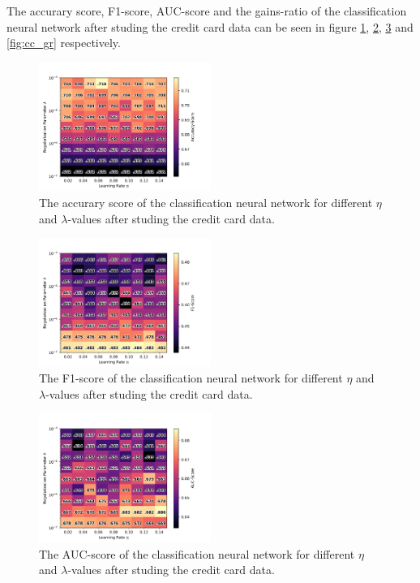 		The accurary score, F1-score, AUC-score and the gains-ratio of the classification neural network after studing the credit card data can be seen in figure \ref{fig:cc_acc}, \ref{fig:cc_F1}, \ref{fig:cc_auc} and \ref{fig:cc_gr} respectively.

		\begin{figure}[H]
			\centering
			\includegraphics[width=0.5\textwidth]{figures/cc_res_0.pdf}
			\caption{The accurary score of the classification neural network for different $\eta$ and $\lambda$-values after studing the credit card data.}
			\label{fig:cc_acc}
		\end{figure}
		\begin{figure}[H]
			\centering
			\includegraphics[width=0.5\textwidth]{figures/cc_res_1.pdf}
			\caption{The F1-score of the classification neural network for different $\eta$ and $\lambda$-values after studing the credit card data.}
			\label{fig:cc_F1}
		\end{figure}
		\begin{figure}[H]
			\centering
			\includegraphics[width=0.5\textwidth]{figures/cc_res_2.pdf}
			\caption{The AUC-score of the classification neural network for different $\eta$ and $\lambda$-values after studing the credit card data.}
			\label{fig:cc_auc}
		\end{figure}

